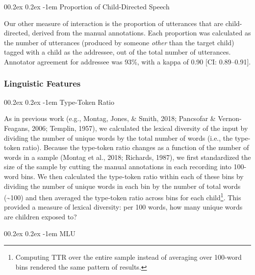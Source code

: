 \documentclass[
  man,floatsintext]{apa6}
\makeatletter
\let\oldparagraph\paragraph
\renewcommand{\paragraph}[1]{\oldparagraph{#1}\mbox{}}
\renewcommand{\paragraph}{\@startsection{paragraph}{4}{\parindent}%
  {0\baselineskip \@plus 0.2ex \@minus 0.2ex}%
  {-1em}%
  {\normalfont\normalsize\bfseries\itshape\typesectitle}}
\makeatother
\begin{document}
\hypertarget{proportion-of-child-directed-speech}{%
\paragraph{Proportion of Child-Directed Speech}\label{proportion-of-child-directed-speech}}

Our other measure of interaction is the proportion of utterances that are child-directed, derived from the manual annotations. Each proportion was calculated as the number of utterances (produced by someone \emph{other} than the target child) tagged with a child as the addressee, out of the total number of utterances. Annotator agreement for addressee was 93\%, with a kappa of 0.90 {[}CI: 0.89--0.91{]}.

\hypertarget{linguistic-features}{%
\subsubsection{Linguistic Features}\label{linguistic-features}}

\hypertarget{type-token-ratio}{%
\paragraph{Type-Token Ratio}\label{type-token-ratio}}

As in previous work (e.g., Montag, Jones, \& Smith, 2018; Pancsofar \& Vernon-Feagans, 2006; Templin, 1957), we calculated the lexical diversity of the input by dividing the number of unique words by the total number of words (i.e., the type-token ratio). Because the type-token ratio changes as a function of the number of words in a sample (Montag et al., 2018; Richards, 1987), we first standardized the size of the sample by cutting the manual annotations in each recording into 100-word bins. We then calculated the type-token ratio within each of these bins by dividing the number of unique words in each bin by the number of total words (\textasciitilde100) and then averaged the type-token ratio across bins for each child\footnote{Computing TTR over the entire sample instead of averaging over 100-word bins rendered the same pattern of results.}. This provided a measure of lexical diversity: per 100 words, how many unique words are children exposed to?

\hypertarget{mlu}{%
\paragraph{MLU}\label{mlu}}
\end{document}
